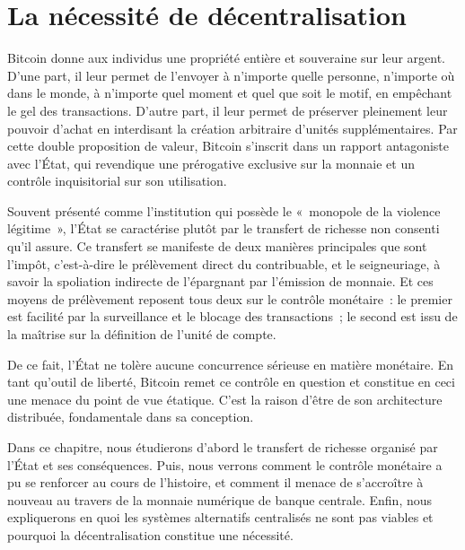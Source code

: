 
\chapter{La nécessité de décentralisation}
\label{ch:adversaire}

Bitcoin donne aux individus une propriété entière et souveraine sur leur argent. D'une part, il leur permet de l'envoyer à n'importe quelle personne, n'importe où dans le monde, à n'importe quel moment et quel que soit le motif, en empêchant le gel des transactions. D'autre part, il leur permet de préserver pleinement leur pouvoir d'achat en interdisant la création arbitraire d'unités supplémentaires. Par cette double proposition de valeur, Bitcoin s'inscrit dans un rapport antagoniste avec l'État, qui revendique une prérogative exclusive sur la monnaie et un contrôle inquisitorial sur son utilisation.

Souvent présenté comme l'institution qui possède le «~monopole de la violence légitime~», l'État se caractérise plutôt par le transfert de richesse non consenti qu'il assure. Ce transfert se manifeste de deux manières principales que sont l'impôt, c'est-à-dire le prélèvement direct du contribuable, et le seigneuriage, à savoir la spoliation indirecte de l'épargnant par l'émission de monnaie. Et ces moyens de prélèvement reposent tous deux sur le contrôle monétaire~: le premier est facilité par la surveillance et le blocage des transactions~; le second est issu de la maîtrise sur la définition de l'unité de compte.

De ce fait, l'État ne tolère aucune concurrence sérieuse en matière monétaire. En tant qu'outil de liberté, Bitcoin remet ce contrôle en question et constitue en ceci une menace du point de vue étatique. C'est la raison d'être de son architecture distribuée, fondamentale dans sa conception.

Dans ce chapitre, nous étudierons d'abord le transfert de richesse organisé par l'État et ses conséquences. Puis, nous verrons comment le contrôle monétaire a pu se renforcer au cours de l'histoire, et comment il menace de s'accroître à nouveau au travers de la monnaie numérique de banque centrale. Enfin, nous expliquerons en quoi les systèmes alternatifs centralisés ne sont pas viables et pourquoi la décentralisation constitue une nécessité.

